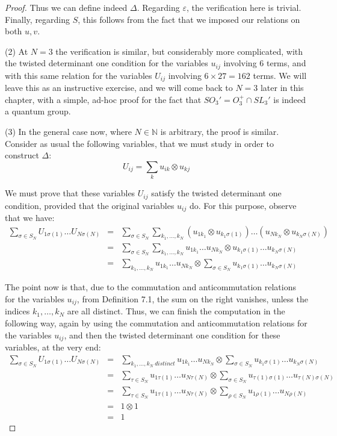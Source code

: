 \documentclass[12pt]{amsbook}
\begin{document}
\begin{proof}
Thus we can define indeed $\Delta$. Regarding $\varepsilon$, the verification here is trivial. Finally, regarding $S$, this follows from the fact that we imposed our relations on both $u,v$. 

\medskip

(2) At $N=3$ the verification is similar, but considerably more complicated, with the twisted determinant one condition for the variables $u_{ij}$ involving 6 terms, and with this same relation for the variables $U_{ij}$ involving $6\times 27=162$ terms. We will leave this as an instructive exercise, and we will come back to $N=3$ later in this chapter, with a simple, ad-hoc proof for the fact that $SO_3'=O_3^+\cap SL_3'$ is indeed a quantum group. 

\medskip

(3) In the general case now, where $N\in\mathbb N$ is arbitrary, the proof is similar. Consider as usual the following variables, that we must study in order to construct $\Delta$:
$$U_{ij}=\sum_ku_{ik}\otimes u_{kj}$$

We must prove that these variables $U_{ij}$ satisfy the twisted determinant one condition, provided that the original variables $u_{ij}$ do. For this purpose, observe that we have:
\begin{eqnarray*}
\sum_{\sigma\in S_N}U_{1\sigma(1)}\ldots U_{N\sigma(N)}
&=&\sum_{\sigma\in S_N}\sum_{k_1,\ldots,k_N}(u_{1k_1}\otimes u_{k_1\sigma(1)})\ldots(u_{Nk_N}\otimes u_{k_N\sigma(N)})\\
&=&\sum_{\sigma\in S_N}\sum_{k_1,\ldots,k_N}u_{1k_1}\ldots u_{Nk_N}\otimes u_{k_1\sigma(1)}\ldots u_{k_N\sigma(N)}\\
&=&\sum_{k_1,\ldots,k_N}u_{1k_1}\ldots u_{Nk_N}\otimes\sum_{\sigma\in S_N}u_{k_1\sigma(1)}\ldots u_{k_N\sigma(N)}
\end{eqnarray*}

The point now is that, due to the commutation and anticommutation relations for the variables $u_{ij}$, from Definition 7.1, the sum on the right vanishes, unless the indices $k_1,\ldots,k_N$ are all distinct. Thus, we can finish the computation in the following way, again by using the commutation and anticommutation relations for the variables $u_{ij}$, and then the twisted determinant one condition for these variables, at the very end:
\begin{eqnarray*}
\sum_{\sigma\in S_N}U_{1\sigma(1)}\ldots U_{N\sigma(N)}
&=&\sum_{k_1,\ldots,k_N\ distinct}u_{1k_1}\ldots u_{Nk_N}\otimes\sum_{\sigma\in S_N}u_{k_1\sigma(1)}\ldots u_{k_N\sigma(N)}\\
&=&\sum_{\tau\in S_N}u_{1\tau(1)}\ldots u_{N\tau(N)}\otimes\sum_{\sigma\in S_N}u_{\tau(1)\sigma(1)}\ldots u_{\tau(N)\sigma(N)}\\
&=&\sum_{\tau\in S_N}u_{1\tau(1)}\ldots u_{N\tau(N)}\otimes\sum_{\rho\in S_N}u_{1\rho(1)}\ldots u_{N\rho(N)}\\
&=&1\otimes1\\
&=&1
\end{eqnarray*}


\end{proof}
\end{document}
